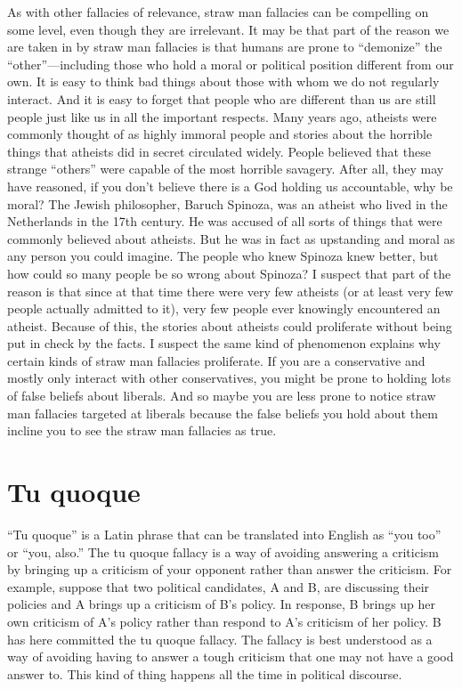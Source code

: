 As with other fallacies of relevance, straw man fallacies can be compelling on
some level, even though they are irrelevant. It may be that part of the reason
we are taken in by straw man fallacies is that humans are prone to ``demonize''
the ``other''—including those who hold a moral or political position different
from our own. It is easy to think bad things about those with whom we do not
regularly interact. And it is easy to forget that people who are different than us
are still people just like us in all the important respects. Many years ago,
atheists were commonly thought of as highly immoral people and stories about
the horrible things that atheists did in secret circulated widely. People believed
that these strange ``others'' were capable of the most horrible savagery. After
all, they may have reasoned, if you don't believe there is a God holding us
accountable, why be moral? The Jewish philosopher, Baruch Spinoza, was an
atheist who lived in the Netherlands in the 17th century. He was accused of all
sorts of things that were commonly believed about atheists. But he was in fact
as upstanding and moral as any person you could imagine. The people who
knew Spinoza knew better, but how could so many people be so wrong about
Spinoza? I suspect that part of the reason is that since at that time there were
very few atheists (or at least very few people actually admitted to it), very few
people ever knowingly encountered an atheist. Because of this, the stories
about atheists could proliferate without being put in check by the facts. I
suspect the same kind of phenomenon explains why certain kinds of straw man
fallacies proliferate. If you are a conservative and mostly only interact with other
conservatives, you might be prone to holding lots of false beliefs about liberals.
And so maybe you are less prone to notice straw man fallacies targeted at
liberals because the false beliefs you hold about them incline you to see the
straw man fallacies as true.

\section{Tu quoque}
``Tu quoque'' is a Latin phrase that can be translated into English as ``you too''
or ``you, also.'' The tu quoque fallacy is a way of avoiding answering a criticism
by bringing up a criticism of your opponent rather than answer the criticism. For
example, suppose that two political candidates, A and B, are discussing their
policies and A brings up a criticism of B's policy. In response, B brings up her
own criticism of A's policy rather than respond to A's criticism of her policy. B
has here committed the tu quoque fallacy. The fallacy is best understood as a
way of avoiding having to answer a tough criticism that one may not have a
good answer to. This kind of thing happens all the time in political discourse.

